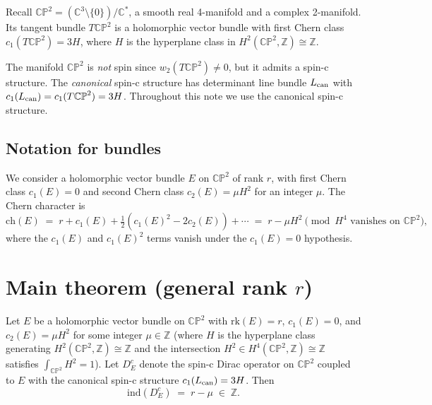 Recall $\mathbb{CP}^2 = (\mathbb{C}^3 \setminus \{0\}) / \mathbb{C}^*$,
a smooth real 4-manifold and a complex 2-manifold. Its tangent bundle
$T\mathbb{CP}^2$ is a holomorphic vector bundle with first Chern class
$c_1(T\mathbb{CP}^2) = 3H$, where $H$ is the hyperplane class in
$H^2(\mathbb{CP}^2, \mathbb{Z}) \cong \mathbb{Z}$.

The manifold $\mathbb{CP}^2$ is \emph{not} spin since
$w_2(T\mathbb{CP}^2) \neq 0$, but it admits a spin-c structure. The
\emph{canonical} spin-c structure has determinant line bundle $L_{\rm
can}$ with $c_1(L_{\rm can}) = c_1(T\mathbb{CP}^2) = 3H$. Throughout
this note we use the canonical spin-c structure.

\subsection{Notation for bundles}

We consider a holomorphic vector bundle $E$ on $\mathbb{CP}^2$ of rank
$r$, with first Chern class $c_1(E) = 0$ and second Chern class
$c_2(E) = \mu H^2$ for an integer $\mu$. The Chern character is
\[
\mathrm{ch}(E) \;=\; r + c_1(E) + \tfrac{1}{2}(c_1(E)^2 - 2 c_2(E)) + \cdots
\;=\; r - \mu H^2 \pmod{H^4 \text{ vanishes on }\mathbb{CP}^2},
\]
where the $c_1(E)$ and $c_1(E)^2$ terms vanish under the
$c_1(E) = 0$ hypothesis.

\section{Main theorem (general rank $r$)}

\begin{theorem}
\label{thm:main}
Let $E$ be a holomorphic vector bundle on $\mathbb{CP}^2$ with
$\mathrm{rk}(E) = r$, $c_1(E) = 0$, and $c_2(E) = \mu H^2$ for some
integer $\mu \in \mathbb{Z}$ (where $H$ is the hyperplane class
generating $H^2(\mathbb{CP}^2,\mathbb{Z}) \cong \mathbb{Z}$ and the
intersection $H^2 \in H^4(\mathbb{CP}^2,\mathbb{Z}) \cong \mathbb{Z}$
satisfies $\int_{\mathbb{CP}^2} H^2 = 1$). Let
$D_E^c$ denote the spin-c Dirac operator on $\mathbb{CP}^2$ coupled to
$E$ with the canonical spin-c structure $c_1(L_{\rm can}) = 3H$. Then
\[
\boxed{\;\mathrm{ind}(D_E^c) \;=\; r - \mu \;\in\; \mathbb{Z}.\;}
\]
\end{theorem}

